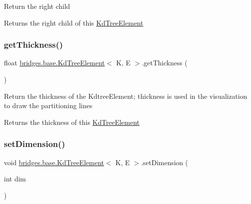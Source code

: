 Return the right child

\begin{DoxyReturn}{Returns}
the right child of this \hyperlink{classbridges_1_1base_1_1_kd_tree_element}{Kd\+Tree\+Element} 
\end{DoxyReturn}
\mbox{\label{classbridges_1_1base_1_1_kd_tree_element_a27c0b086af284210855ee5f1c90e7484}} 
\subsubsection{\texorpdfstring{get\+Thickness()}{getThickness()}}
{\footnotesize\ttfamily float \hyperlink{classbridges_1_1base_1_1_kd_tree_element}{bridges.\+base.\+Kd\+Tree\+Element}$<$ K, E $>$.get\+Thickness (\begin{DoxyParamCaption}{ }\end{DoxyParamCaption})}

Return the thickness of the Kdtree\+Element; thickness is used in the visualization to draw the partitioning lines

\begin{DoxyReturn}{Returns}
the thickness of this \hyperlink{classbridges_1_1base_1_1_kd_tree_element}{Kd\+Tree\+Element} 
\end{DoxyReturn}
\mbox{\label{classbridges_1_1base_1_1_kd_tree_element_af3fa89cbd20fc2c3f30784db16b6dec4}} 
\subsubsection{\texorpdfstring{set\+Dimension()}{setDimension()}}
{\footnotesize\ttfamily void \hyperlink{classbridges_1_1base_1_1_kd_tree_element}{bridges.\+base.\+Kd\+Tree\+Element}$<$ K, E $>$.set\+Dimension (\begin{DoxyParamCaption}\item[{int}]{dim }\end{DoxyParamCaption})}

